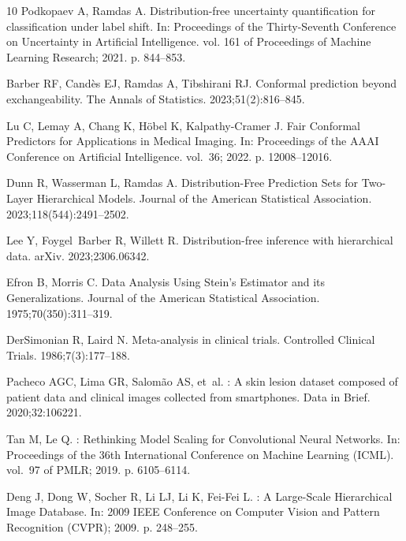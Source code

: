 \documentclass[VANCOUVER,Times1COL]{WileyNJDv5}
\begin{document}
\begin{thebibliography}{10}
Podkopaev A, Ramdas A.
\newblock Distribution-free uncertainty quantification for classification under
  label shift.
\newblock In: Proceedings of the Thirty-Seventh Conference on Uncertainty in
  Artificial Intelligence. vol. 161 of Proceedings of Machine Learning
  Research; 2021. p. 844--853.

Barber RF, Cand{\`e}s EJ, Ramdas A, Tibshirani RJ.
\newblock Conformal prediction beyond exchangeability.
\newblock The Annals of Statistics. 2023;51(2):816--845.

Lu C, Lemay A, Chang K, H{\"o}bel K, Kalpathy-Cramer J.
\newblock Fair Conformal Predictors for Applications in Medical Imaging.
\newblock In: Proceedings of the AAAI Conference on Artificial Intelligence.
  vol.~36; 2022. p. 12008--12016.

Dunn R, Wasserman L, Ramdas A.
\newblock Distribution-Free Prediction Sets for Two-Layer Hierarchical Models.
\newblock Journal of the American Statistical Association.
  2023;118(544):2491--2502.

Lee Y, Foygel~Barber R, Willett R.
\newblock Distribution-free inference with hierarchical data.
\newblock arXiv. 2023;2306.06342.

Efron B, Morris C.
\newblock Data Analysis Using {S}tein's Estimator and its Generalizations.
\newblock Journal of the American Statistical Association.
  1975;70(350):311--319.

DerSimonian R, Laird N.
\newblock Meta-analysis in clinical trials.
\newblock Controlled Clinical Trials. 1986;7(3):177--188.

Pacheco AGC, Lima GR, Salom{\~a}o AS, et~al.
: A skin lesion dataset composed of patient data and
  clinical images collected from smartphones.
\newblock Data in Brief. 2020;32:106221.

Tan M, Le Q.
: Rethinking Model Scaling for Convolutional Neural
  Networks.
\newblock In: Proceedings of the 36th International Conference on Machine
  Learning (ICML). vol.~97 of PMLR; 2019. p. 6105--6114.

Deng J, Dong W, Socher R, Li LJ, Li K, Fei-Fei L.
: A Large-Scale Hierarchical Image Database.
\newblock In: 2009 IEEE Conference on Computer Vision and Pattern Recognition
  (CVPR); 2009. p. 248--255.


\end{thebibliography}
\end{document}
